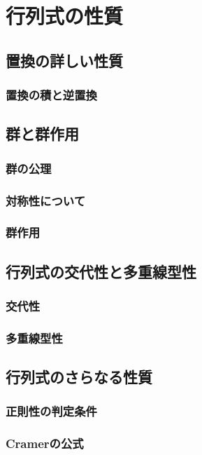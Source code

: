 \chapter{行列式の性質}

\section{置換の詳しい性質}

\subsection{置換の積と逆置換}

\section{群と群作用}

\subsection{群の公理}

\subsection{対称性について}

\subsection{群作用}


\section{行列式の交代性と多重線型性}


\subsection{交代性}

\subsection{多重線型性}

\section{行列式のさらなる性質}

\subsection{正則性の判定条件}

\subsection{Cramerの公式}

